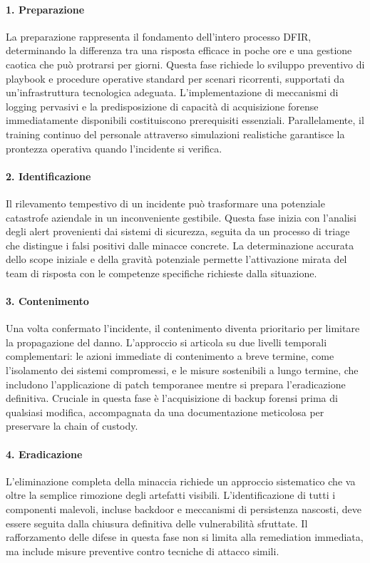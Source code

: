 \paragraph{1. Preparazione}
La preparazione rappresenta il fondamento dell'intero processo DFIR, determinando la differenza tra una risposta efficace in poche ore e una gestione caotica che può protrarsi per giorni. Questa fase richiede lo sviluppo preventivo di playbook e procedure operative standard per scenari ricorrenti, supportati da un'infrastruttura tecnologica adeguata. L'implementazione di meccanismi di logging pervasivi e la predisposizione di capacità di acquisizione forense immediatamente disponibili costituiscono prerequisiti essenziali. Parallelamente, il training continuo del personale attraverso simulazioni realistiche garantisce la prontezza operativa quando l'incidente si verifica.

\paragraph{2. Identificazione}
Il rilevamento tempestivo di un incidente può trasformare una potenziale catastrofe aziendale in un inconveniente gestibile. Questa fase inizia con l'analisi degli alert provenienti dai sistemi di sicurezza, seguita da un processo di triage che distingue i falsi positivi dalle minacce concrete. La determinazione accurata dello scope iniziale e della gravità potenziale permette l'attivazione mirata del team di risposta con le competenze specifiche richieste dalla situazione.

\paragraph{3. Contenimento}
Una volta confermato l'incidente, il contenimento diventa prioritario per limitare la propagazione del danno. L'approccio si articola su due livelli temporali complementari: le azioni immediate di contenimento a breve termine, come l'isolamento dei sistemi compromessi, e le misure sostenibili a lungo termine, che includono l'applicazione di patch temporanee mentre si prepara l'eradicazione definitiva. Cruciale in questa fase è l'acquisizione di backup forensi prima di qualsiasi modifica, accompagnata da una documentazione meticolosa per preservare la chain of custody.

\paragraph{4. Eradicazione}
L'eliminazione completa della minaccia richiede un approccio sistematico che va oltre la semplice rimozione degli artefatti visibili. L'identificazione di tutti i componenti malevoli, incluse backdoor e meccanismi di persistenza nascosti, deve essere seguita dalla chiusura definitiva delle vulnerabilità sfruttate. Il rafforzamento delle difese in questa fase non si limita alla remediation immediata, ma include misure preventive contro tecniche di attacco simili.

